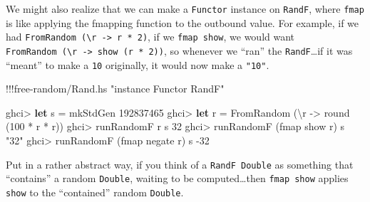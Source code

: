 \documentclass[]{article}
\newenvironment{Shaded}{}{}
\newcommand{\KeywordTok}[1]{\textcolor[rgb]{0.00,0.44,0.13}{\textbf{{#1}}}}
\newcommand{\DataTypeTok}[1]{\textcolor[rgb]{0.56,0.13,0.00}{{#1}}}
\newcommand{\DecValTok}[1]{\textcolor[rgb]{0.25,0.63,0.44}{{#1}}}
\newcommand{\StringTok}[1]{\textcolor[rgb]{0.25,0.44,0.63}{{#1}}}
\newcommand{\OtherTok}[1]{\textcolor[rgb]{0.00,0.44,0.13}{{#1}}}
\newcommand{\FunctionTok}[1]{\textcolor[rgb]{0.02,0.16,0.49}{{#1}}}
\newcommand{\NormalTok}[1]{{#1}}
\begin{document}
We might also realize that we can make a \texttt{Functor} instance on
\texttt{RandF}, where \texttt{fmap} is like applying the fmapping
function to the outbound value. For example, if we had
\texttt{FromRandom\ (\textbackslash{}r\ -\textgreater{}\ r\ *\ 2)}, if
we \texttt{fmap\ show}, we would want
\texttt{FromRandom\ (\textbackslash{}r\ -\textgreater{}\ show\ (r\ *\ 2))},
so whenever we ``ran'' the \texttt{RandF}\ldots{}if it was ``meant'' to
make a \texttt{10} originally, it would now make a \texttt{"10"}.

\begin{Shaded}
\begin{Highlighting}[]
\FunctionTok{!!!}\NormalTok{free}\FunctionTok{-}\NormalTok{random}\FunctionTok{/}\NormalTok{Rand.hs }\StringTok{"instance Functor RandF"}
\end{Highlighting}
\end{Shaded}

\begin{Shaded}
\begin{Highlighting}[]
\NormalTok{ghci}\FunctionTok{>} \KeywordTok{let} \NormalTok{s }\FunctionTok{=} \NormalTok{mkStdGen }\DecValTok{192837465}
\NormalTok{ghci}\FunctionTok{>} \KeywordTok{let} \NormalTok{r }\FunctionTok{=} \DataTypeTok{FromRandom} \NormalTok{(\textbackslash{}r }\OtherTok{->} \NormalTok{round (}\DecValTok{100} \FunctionTok{*} \NormalTok{r }\FunctionTok{*} \NormalTok{r))}
\NormalTok{ghci}\FunctionTok{>} \NormalTok{runRandomF r s}
\DecValTok{32}
\NormalTok{ghci}\FunctionTok{>} \NormalTok{runRandomF (fmap show r) s}
\StringTok{"32"}
\NormalTok{ghci}\FunctionTok{>} \NormalTok{runRandomF (fmap negate r) s}
\FunctionTok{-}\DecValTok{32}
\end{Highlighting}
\end{Shaded}

Put in a rather abstract way, if you think of a \texttt{RandF\ Double}
as something that ``contains'' a random \texttt{Double}, waiting to be
computed\ldots{}then \texttt{fmap\ show} applies \texttt{show} to the
``contained'' random \texttt{Double}.
\end{document}
